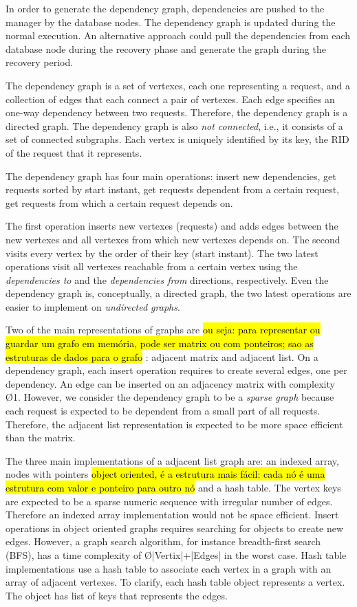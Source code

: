 In order to generate the dependency graph, dependencies are pushed to the manager by the database nodes. The dependency graph is updated during the normal execution. An alternative approach could pull the dependencies from each database node during the recovery phase and generate the graph during the recovery period.

The dependency graph is a set of vertexes, each one representing a request, and a collection of edges that each connect a pair of vertexes. Each edge specifies an one-way dependency between two requests. Therefore, the dependency graph is a directed graph. The dependency graph is also \emph{not connected}, i.e., it consists of a set of connected subgraphs. Each vertex is uniquely identified by its key, the \ac{RID} of the request that it represents. 


The dependency graph has four main operations: insert new dependencies, get requests sorted by start instant, get requests dependent from a certain request, get requests from which a certain request depends on.

The first operation inserts new vertexes (requests) and adds edges between the new vertexes and all vertexes from which new vertexes depends on. The second visits every vertex by the order of their key (start instant). The two latest operations visit all vertexes reachable from a certain vertex using the \emph{dependencies to} and the \emph{dependencies from} directions, respectively. Even the dependency graph is, conceptually, a directed graph, the two latest operations are easier to implement on \emph{undirected graphs}.

Two of the main representations of graphs are \hl{ou seja: para representar ou guardar um grafo em memória, pode ser matrix ou com ponteiros; sao as estruturas de dados para o grafo} : adjacent matrix and adjacent list. On a dependency graph, each insert operation requires to create several edges, one per dependency. An edge can be inserted on an adjacency matrix with complexity \O{1}. However, we consider the dependency graph to be a \emph{sparse graph} because each request is expected to be dependent from a small part of all requests. Therefore, the adjacent list representation is expected to be more space efficient than the matrix.

The three main implementations of a adjacent list graph are: an indexed array, nodes with pointers \hl{object oriented, é a estrutura mais fácil: cada nó é uma estrutura com valor e ponteiro para outro nó} and a hash table. The vertex keys are expected to be a sparse numeric sequence with irregular number of edges. Therefore an indexed array implementation would not be space efficient. Insert operations in object oriented graphs requires searching for objects to create new edges. However, a graph search algorithm, for instance breadth-first search (BFS), has a time complexity of \O{|Vertix|+|Edges|} in the worst case.
Hash table implementations use a hash table to associate each vertex in a graph with an array of adjacent vertexes. To clarify, each hash table object represents a vertex. The object has list of keys that represents the edges. \\

